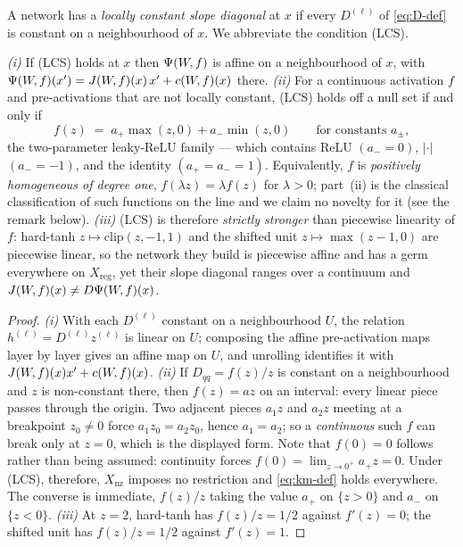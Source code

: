\begin{definition}\label{def:lcs}
A network has a \emph{locally constant slope diagonal} at $x$ if every
$D^{(\ell)}$ of \eqref{eq:D-def} is constant on a neighbourhood of $x$. We
abbreviate the condition (LCS).
\end{definition}

\begin{proposition}\label{prop:lcs}
\emph{(i)} If (LCS) holds at $x$ then $\Psi(W\!,f)$ is affine on a neighbourhood of
$x$, with $\Psi(W\!,f)(x')=J(W\!,f)(x)\,x'+c(W\!,f)(x)$ there.
\emph{(ii)} For a continuous activation $f$ and pre-activations
that are not locally constant, (LCS) holds off a null set if and only if
\[
f(z)\;=\;a_{+}\max(z,0)+a_{-}\min(z,0)
\qquad\text{for constants }a_{\pm},
\]
the two-parameter leaky-ReLU family --- which contains
$\mathrm{ReLU}$ $(a_-{=}0)$, $|\cdot|$ $(a_-{=}{-}1)$, and the identity
$(a_+{=}a_-{=}1)$. Equivalently, $f$ is \emph{positively homogeneous of degree
one}, $f(\lambda z)=\lambda f(z)$ for $\lambda>0$; part~(ii) is the classical
classification of such functions on the line and we claim no novelty for it
(see the remark below). \emph{(iii)} (LCS) is therefore \emph{strictly stronger}
than piecewise linearity of $f$: hard-tanh $z\mapsto\mathrm{clip}(z,-1,1)$ and
the shifted unit $z\mapsto\max(z-1,0)$ are piecewise linear, so the network they
build is piecewise affine and has a germ everywhere on $X_{\mathrm{reg}}$, yet
their slope diagonal ranges over a continuum and $J(W\!,f)(x)\neq D\Psi(W\!,f)(x)$.
\end{proposition}

\begin{proof}
\emph{(i)} With each $D^{(\ell)}$ constant on a neighbourhood $U$, the relation
$h^{(\ell)}=D^{(\ell)}z^{(\ell)}$ is linear on $U$; composing the affine
pre-activation maps layer by layer gives an affine map on $U$, and unrolling
identifies it with $J(W\!,f)(x)x'+c(W\!,f)(x)$. \emph{(ii)} If $D_{qq}=f(z)/z$ is
constant on a neighbourhood and $z$ is non-constant there, then $f(z)=az$ on an
interval: every linear piece passes through the origin. Two adjacent pieces
$a_1z$ and $a_2z$ meeting at a breakpoint $z_0\neq0$ force $a_1z_0=a_2z_0$,
hence $a_1=a_2$; so a \emph{continuous} such $f$ can break only at $z=0$, which
is the displayed form. Note that $f(0)=0$ follows rather than being assumed:
continuity forces $f(0)=\lim_{z\to0^{+}}a_{+}z=0$. Under (LCS), therefore,
$X_{\mathrm{nz}}$ imposes no restriction and \eqref{eq:km-def} holds everywhere. The converse is immediate, $f(z)/z$ taking the value
$a_+$ on $\{z>0\}$ and $a_-$ on $\{z<0\}$. \emph{(iii)} At $z=2$, hard-tanh has
$f(z)/z=1/2$ against $f'(z)=0$; the shifted unit has $f(z)/z=1/2$ against
$f'(z)=1$.
\end{proof}

